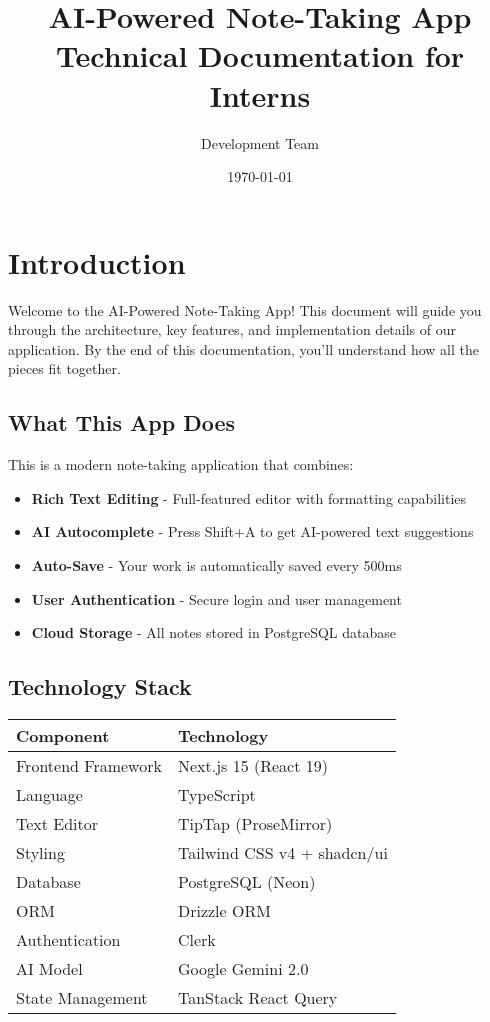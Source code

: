 \documentclass[11pt,a4paper]{article}
\title{\textbf{AI-Powered Note-Taking App}\\
\large Technical Documentation for Interns}
\author{Development Team}
\date{\today}
\begin{document}
\maketitle
\tableofcontents
\newpage


\section{Introduction}

Welcome to the AI-Powered Note-Taking App! This document will guide you through the architecture, key features, and implementation details of our application. By the end of this documentation, you'll understand how all the pieces fit together.

\subsection{What This App Does}

This is a modern note-taking application that combines:
\begin{itemize}
    \item \textbf{Rich Text Editing} - Full-featured editor with formatting capabilities
    \item \textbf{AI Autocomplete} - Press Shift+A to get AI-powered text suggestions
    \item \textbf{Auto-Save} - Your work is automatically saved every 500ms
    \item \textbf{User Authentication} - Secure login and user management
    \item \textbf{Cloud Storage} - All notes stored in PostgreSQL database
\end{itemize}

\subsection{Technology Stack}

\begin{table}[h]
\centering
\begin{tabular}{|l|l|}
\hline
\textbf{Component} & \textbf{Technology} \\
\hline
Frontend Framework & Next.js 15 (React 19) \\
Language & TypeScript \\
Text Editor & TipTap (ProseMirror) \\
Styling & Tailwind CSS v4 + shadcn/ui \\
Database & PostgreSQL (Neon) \\
ORM & Drizzle ORM \\
Authentication & Clerk \\
AI Model & Google Gemini 2.0 \\
State Management & TanStack React Query \\
\hline
\end{tabular}
\end{table}
\end{document}
